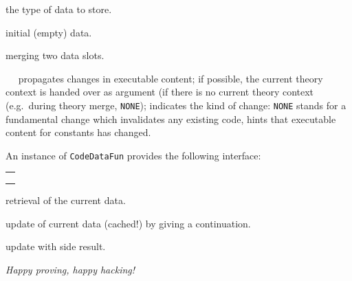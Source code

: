 \begin{isabellebody}
\begin{isamarkuptext}
  \begin{description}

  \item {} the type of data to store.

  \item {} initial (empty) data.

  \item {} merging two data slots.

  \item {}~~ propagates changes in executable content;
    if possible, the current theory context is handed over
    as argument  (if there is no current theory context (e.g.~during
    theory merge, \verb|NONE|);  indicates the kind
    of change: \verb|NONE| stands for a fundamental change
    which invalidates any existing code, 
    hints that executable content for constants 
    has changed.

  \end{description}

  An instance of \verb|CodeDataFun| provides the following
  interface:

  \medskip
  \begin{tabular}{l}
  \isa{get{\isacharcolon}\ theory\ {\isasymrightarrow}\ T} \\
  \isa{change{\isacharcolon}\ theory\ {\isasymrightarrow}\ {\isacharparenleft}T\ {\isasymrightarrow}\ T{\isacharparenright}\ {\isasymrightarrow}\ T} \\
  \isa{change{\isacharunderscore}yield{\isacharcolon}\ theory\ {\isasymrightarrow}\ {\isacharparenleft}T\ {\isasymrightarrow}\ {\isacharprime}a\ {\isacharasterisk}\ T{\isacharparenright}\ {\isasymrightarrow}\ {\isacharprime}a\ {\isacharasterisk}\ T}
  \end{tabular}

  \begin{description}

  \item {} retrieval of the current data.

  \item {} update of current data (cached!)
    by giving a continuation.

  \item {} update with side result.

  \end{description}%
\end{isamarkuptext}%
\isamarkuptrue%
%
\begin{isamarkuptext}%
\emph{Happy proving, happy hacking!}%
\end{isamarkuptext}%
\isamarkuptrue%
%
\isadelimtheory
%
\endisadelimtheory
%
\isatagtheory
{}\isamarkupfalse%
%
\endisatagtheory
{\isafoldtheory}%
%
\isadelimtheory
%
\endisadelimtheory
\isanewline
\end{isabellebody}%
